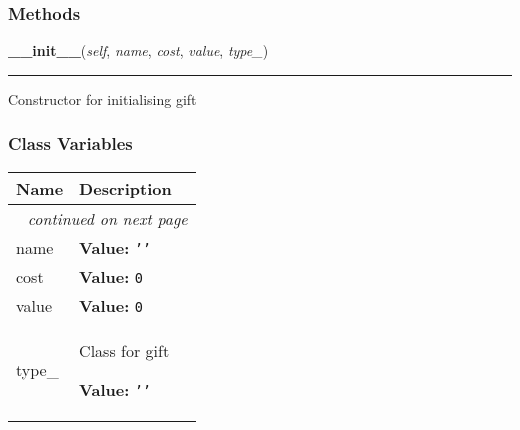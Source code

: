 
  \subsubsection{Methods}

    \label{gift_item:Gift:__init__}

    \vspace{0.5ex}

\hspace{.8\funcindent}\begin{boxedminipage}{\funcwidth}

    \raggedright \textbf{\_\_init\_\_}(\textit{self}, \textit{name}, \textit{cost}, \textit{value}, \textit{type\_})

    \vspace{-1.5ex}

    \rule{\textwidth}{0.5\fboxrule}
\setlength{\parskip}{2ex}
    Constructor for initialising gift

\setlength{\parskip}{1ex}
    \end{boxedminipage}



  \subsubsection{Class Variables}

    \vspace{-1cm}
\hspace{\varindent}\begin{longtable}{|p{\varnamewidth}|p{\vardescrwidth}|l}
\cline{1-2}
\cline{1-2} \centering \textbf{Name} & \centering \textbf{Description}& \\
\cline{1-2}
\endhead\cline{1-2}\multicolumn{3}{r}{\small\textit{continued on next page}}\\\endfoot\cline{1-2}
\endlastfoot\raggedright n\-a\-m\-e\- & \raggedright \textbf{Value:} 
{\tt \texttt{'}\texttt{}\texttt{'}}&\\
\cline{1-2}
\raggedright c\-o\-s\-t\- & \raggedright \textbf{Value:} 
{\tt 0}&\\
\cline{1-2}
\raggedright v\-a\-l\-u\-e\- & \raggedright \textbf{Value:} 
{\tt 0}&\\
\cline{1-2}
\raggedright t\-y\-p\-e\-\_\- & \raggedright Class for gift

\textbf{Value:} 
{\tt \texttt{'}\texttt{}\texttt{'}}&\\
\cline{1-2}
\end{longtable}

